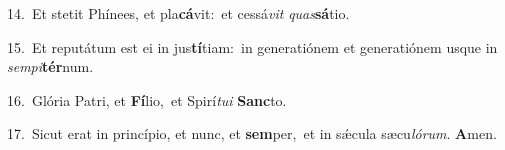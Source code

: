 {\numbfont\textcolor{\numbcolor}{14.}}~Et stetit Phínees, et pla\-\textbf{cá}\-vit:~\star et cessá\textit{vit} \textit{quas}\-\textbf{sá}tio.\par
{\numbfont\textcolor{\numbcolor}{15.}}~Et reputátum est ei in jus\-\textbf{tí}\-tiam:~\star in generatiónem et generatiónem usque in \textit{sem}\-\textit{pi}\textbf{tér}num.\par
{\numbfont\textcolor{\numbcolor}{16.}}~Glória Patri, et \textbf{Fí}\-lio,~\star et Spirí\-\textit{tu}\-\textit{i} \textbf{Sanc}\-to.\par
{\numbfont\textcolor{\numbcolor}{17.}}~Sicut erat in princípio, et nunc, et \textbf{sem}\-per,~\star et in sǽcula sæcu\-\textit{ló}\-\textit{rum}. \textbf{A}\-men.\par
